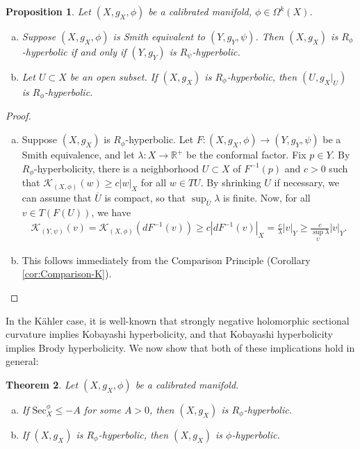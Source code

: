 \documentclass[11pt]{article}
\newcommand{\R}{\mathbb{R}}
\newtheorem{thm}{Theorem}[section]
\newtheorem{prop}[thm]{Proposition}
\theoremstyle{definition}
\numberwithin{equation}{section}
\begin{document}
\begin{prop} Let $(X, g_X, \phi)$ be a calibrated manifold, $\phi \in \Omega^k(X)$.
\begin{enumerate}[(a)]
\item Suppose $(X, g_X, \phi)$ is Smith equivalent to $(Y, g_Y, \psi)$.  Then $(X, g_X)$ is $R_\phi$-hyperbolic if and only if $(Y, g_Y)$ is $R_\psi$-hyperbolic.
\item Let $U \subset X$ be an open subset.  If $(X, g_X)$ is $R_\phi$-hyperbolic, then $(U, g_X|_U)$ is $R_\phi$-hyperbolic.
\end{enumerate}
\end{prop}

\begin{proof} ${}$
\begin{enumerate}[(a)]
\item Suppose $(X, g_X)$ is $R_\phi$-hyperbolic.  Let $F \colon (X, g_X, \phi) \to (Y, g_Y, \psi)$ be a Smith equivalence, and let $\lambda \colon X \to \R^+$ be the conformal factor.  Fix $p \in Y$.  By $R_\phi$-hyperbolicity, there is a neighborhood $U \subset X$ of $F^{-1}(p)$ and $c > 0$ such that $\mathcal{K}_{(X,\phi)}(w) \geq c |w|_X$ for all $w \in TU$.  By shrinking $U$ if necessary, we can assume that $\overline{U}$ is compact, so that $\sup_{\overline{U}} \lambda $ is finite.  Now, for all $v \in T(F(U))$, we have
\begin{align*}
\mathcal{K}_{(Y, \psi)}(v) = \mathcal{K}_{(X,\phi)}(dF^{-1}(v)) \geq c \left| dF^{-1}(v) \right|_X = \frac{c}{\lambda} \left| v \right|_Y \geq \frac{c}{\sup_{\overline{U}} \lambda} \left| v \right|_Y.
\end{align*}
\item This follows immediately from the Comparison Principle (Corollary \ref{cor:Comparison-K}).
\end{enumerate}
\end{proof}


\indent In the K\"{a}hler case, it is well-known that strongly negative holomorphic sectional curvature implies Kobayashi hyperbolicity, and that Kobayashi hyperbolicity implies Brody hyperbolicity.  We now show that both of these implications hold in general:

\begin{thm} \label{thm:RImpliesPhi} Let $(X, g_X, \phi)$ be a calibrated manifold.
\begin{enumerate}[(a)]
\item If $\mathrm{Sec}^\phi_X \leq -A$ for some $A > 0$, then $(X, g_X)$ is $R_\phi$-hyperbolic.
\item If $(X, g_X)$ is $R_\phi$-hyperbolic, then $(X, g_X)$ is $\phi$-hyperbolic.
\end{enumerate}
\end{thm}
\end{document}
